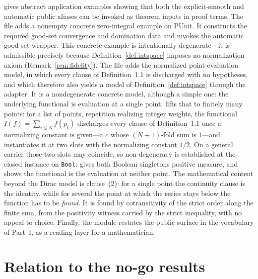 \documentclass[11pt]{article}
\theoremstyle{definition}
\theoremstyle{remark}
\begin{document}
 gives abstract application examples showing that both the explicit-smooth and automatic public aliases can be invoked as theorem inputs in proof terms.  The file  adds a nonempty concrete zero-integral example on \(\mathrm{PUnit}\).  It constructs the required good-set convergence and domination data and invokes the automatic good-set wrapper.  This concrete example is intentionally degenerate---it is admissible precisely because Definition~\ref{def:intspace} imposes no normalization axiom (Remark~\ref{rem:fidelity}).  The file  adds the normalized point-evaluation model, in which every clause of Definition~1.1 is discharged with no hypotheses, and which therefore also yields a model of Definition~\ref{def:intspace} through the adapter.  It is a nondegenerate concrete model, although a simple one: the underlying functional is evaluation at a single point.   lifts that to finitely many points: for a list of points, repetition realizing integer weights, the functional $I(f)=\sum_{i\le N} f(p_i)$ discharges every clause of Definition~1.1 once a normalizing constant is given---a $c$ whose $(N+1)$-fold sum is $1$---and  instantiates it at two slots with the normalizing constant $1/2$.  On a general carrier those two slots may coincide, so non-degeneracy is established at the closed instance on \texttt{Bool}:  gives both Boolean singletons positive measure, and  shows the functional is the evaluation at neither point.  The mathematical content beyond the Dirac model is clause~(2): for a single point the continuity clause is the identity, while for several the point at which the series stays below the function has to be \emph{found}.  It is found by cotransitivity of the strict order along the finite sum, from the positivity witness carried by the strict inequality, with no appeal to choice.  Finally, the module  restates the public surface in the vocabulary of Part~I, as a reading layer for a mathematician.

\section{Relation to the no-go results}
\label{sec:nogo}
\end{document}
